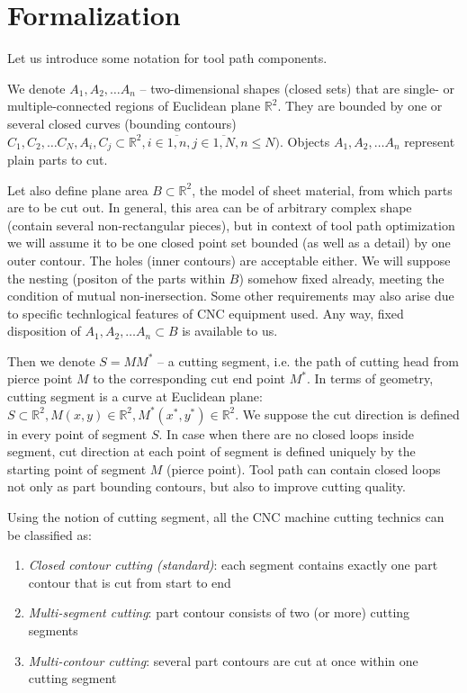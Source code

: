\documentclass{ifacconf}
\begin{document}
\section{Formalization}

Let us introduce some notation for tool path components.

We denote $A_1, A_2, \dots A_n$ -- two-dimensional shapes
(closed sets)
that are single- or multiple-connected
regions of Euclidean plane
$\mathbb R^2$.
They are bounded by one or several closed curves
(bounding contours)
$C_1, C_2, \dots C_N,
A_i, C_j \subset \mathbb R^2,
i \in \overline{1, n},
j \in \overline{1, N},
n \leqslant N)$.
Objects $A_1, A_2, \dots A_n$
represent plain parts to cut.

Let also define plane area
$B \subset \mathbb R^2$,
the model of
sheet material, from which parts are to be cut out.
In general,
this area can be of arbitrary complex shape
(contain several non-rectangular pieces),
but in context of tool path optimization
we will assume it to be
one closed point set bounded
(as well as a detail) by one outer contour.
The holes
(inner contours) are acceptable either.
We will suppose the nesting
(positon of the parts within $B$)
somehow fixed already,
meeting the condition of
mutual non-inersection.
Some other requirements may also arise
due to specific technlogical features
of CNC equipment used.
Any way,
fixed disposition of
$A_1, A_2, \dots A_n \subset B$
is available to us.

Then we denote $S=MM^*$ -- a cutting segment,
i.e. the path of cutting head
from pierce point $M$
to the corresponding cut end point $M^*$.
In terms of geometry,
cutting segment is a curve at Euclidean plane:
$S \subset \mathbb R^2,
M(x,y) \in \mathbb R^2,
M^*(x^*,y^*) \in \mathbb R^2$.
We suppose
the cut direction is defined
in every point of segment $S$.
In case when there are no
closed loops inside segment,
cut direction at each point of segment
is defined uniquely by the starting
point of segment $M$
(pierce point).
Tool path can contain closed loops
not only as part bounding contours,
but also to improve cutting quality.

Using the notion of cutting segment,
all the CNC machine cutting technics
can be classified as:
\begin{enumerate}
    \item{\textit{Closed contour cutting (standard)}}:
    each segment contains exactly one part contour
    that is cut from start to end
    \item{\textit{Multi-segment cutting}}:
    part contour consists of two (or more) cutting segments
    \item{\textit{Multi-contour cutting}}:
    several part contours are cut at once within one cutting segment
\end{enumerate}
\end{document}
